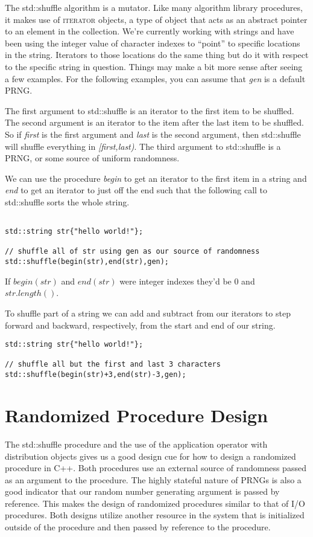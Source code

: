 \documentclass[]{tufte-handout}
\begin{document}
The std::shuffle algorithm is a mutator.  Like many algorithm library procedures, it makes use of \textsc{iterator} objects, a type of object that acts as an abstract pointer to an element in the collection. We're currently working with strings and have been using the integer value of character indexes to ``point'' to specific locations in the string. Iterators to those locations do the same thing but do it with respect to the specific string in question. Things may make a bit more sense after seeing a few examples. For the following examples, you can assume that \textit{gen} is a default PRNG.

The first argument to std::shuffle is an iterator to the first item to be shuffled. The second argument is an iterator to the item after the last item to be shuffled. So if \textit{first} is the first argument and \textit{last} is the second argument, then std::shuffle will shuffle everything in \textit{[first,last)}. The third argument to std::shuffle is a PRNG, or some source of uniform randomness.

We can use the procedure \textit{begin} to get an iterator to the first item in a string and \textit{end} to get an iterator to just off the end such that the following call to std::shuffle sorts the whole string.
\begin{verbatim}

std::string str{"hello world!"};

// shuffle all of str using gen as our source of randomness
std::shuffle(begin(str),end(str),gen);
\end{verbatim}
If $begin(str)$ and $end(str)$ were integer indexes they'd be $0$ and $str.length()$.


To shuffle part of a string we can add and subtract from our iterators to step forward and backward, respectively, from the start and end of our string.
\begin{verbatim}
std::string str{"hello world!"};

// shuffle all but the first and last 3 characters
std::shuffle(begin(str)+3,end(str)-3,gen);
\end{verbatim}

\section{Randomized Procedure Design}

The std::shuffle procedure and the use of the application operator with distribution objects gives us a good design cue for how to design a randomized procedure in C++. Both procedures use an external source of randomness passed as an argument to the procedure. The highly stateful nature of PRNGs is also a good indicator that our random number generating argument is passed by reference. This makes the design of randomized procedures similar to that of I/O procedures. Both designs utilize another resource in the system that is initialized outside of the procedure and then passed by reference to the procedure.
\end{document}
